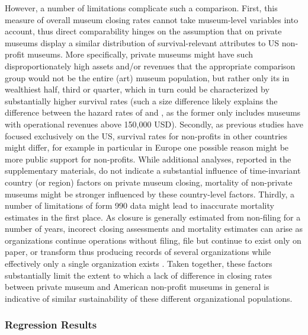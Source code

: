 \documentclass[12pt]{article}
\begin{document}
However, a number of limitations complicate such a comparison.
First, this measure of overall museum closing rates cannot take museum-level variables into account, thus direct comparability hinges on the assumption that on private museums display a similar distribution of survival-relevant attributes to US non-profit museums.
More specifically, private museums might have such disproportionately high assets and/or revenues that the appropriate comparison group would not be the entire (art) museum population, but rather only its in wealthiest half, third or quarter, which in turn could be characterized by substantially higher survival rates (such a size difference likely explains the difference between the hazard rates of \textcite{Gordon_etal_2013_insolvency} and \textcite{Bowen_etal_1994_charitable}, as the former only includes museums with operational revenues above 150,000 USD).
Secondly, as previous studies have focused exclusively on the US, survival rates for non-profits in other countries might differ, for example in particular in Europe one possible reason might be more public support for non-profits.
While additional analyses, reported in the supplementary materials, do not indicate a substantial influence of time-invariant country (or region) factors on private museum closing, mortality of non-private museums might be stronger influenced by these country-level factors.
Thirdly, a number of limitations of form 990 data might lead to inaccurate mortality estimates in the first place.
As closure is generally estimated from non-filing for a number of years, incorect closing assessments and mortality estimates can arise as organizations continue operations without filing, file but continue to exist only on paper, or transform thus producing records of several organizations while effectively only a single organization exists \parencite{Bielefeld_1994_survival}.
Taken together, these factors substantially limit the extent to which a lack of difference in closing rates between private museum and American non-profit museums in general is indicative of similar sustainability of these different organizational populations. 
\subsubsection*{Regression Results}
\end{document}
